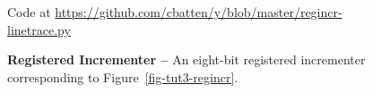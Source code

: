 
\begin{figure}

  \begin{lstlisting}[xleftmargin={0.5in}]

  \end{lstlisting}

  \centerline{\small Code at
    \url{https://github.com/cbatten/y/blob/master/regincr-linetrace.py}}

  \caption{\textbf{Registered Incrementer --} An eight-bit registered
    incrementer corresponding to Figure~\ref{fig-tut3-regincr}.}
  \label{code-tut3-regincr}

\end{figure}

